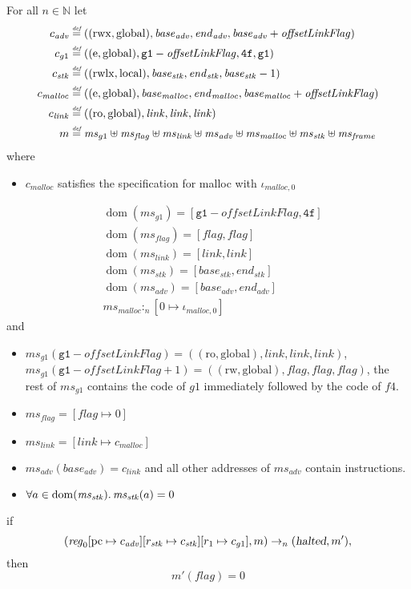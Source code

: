\documentclass[a4paper]{article}
\newcommand{\update}[2]{[#1 \mapsto #2]}
\newcommand{\defeq}{\stackrel{\textit{\tiny{def}}}{=}}
\DeclareMathOperator{\dom}{dom}
\newcommand{\var}[1]{\mathit{#1}}
\newcommand{\hs}{\var{ms}}
\newcommand{\ms}{\hs}
\newcommand{\pcreg}{\mathrm{pc}}
\newcommand{\start}{\var{base}}
\newcommand{\addrend}{\var{end}}
\newcommand{\reg}{\var{reg}}
\newcommand{\heap}{\var{mem}}
\newcommand{\adv}{\var{adv}}
\newcommand{\link}{\var{link}}
\newcommand{\stk}{\var{stk}}
\newcommand{\flag}{\var{flag}}
\newcommand{\pwl}{\var{pwl}}
\newcommand{\olf}{\var{offsetLinkFlag}}
\newcommand{\halted}{\textsl{halted}}
\newcommand{\heapSat}[3][\heap]{#1 :_{#2} #3}
\newcommand{\memSat}[3][n]{\heapSat[#2]{#1}{#3}}
\newcommand{\codelabel}[1]{\mathit{#1}}
\newcommand{\malloc}{\codelabel{malloc}}
\newcommand{\nats}{\mathbb{N}}
\newcommand{\plainperm}[1]{\mathrm{#1}}
\newcommand{\readonly}{\plainperm{ro}}
\newcommand{\readwrite}{\plainperm{rw}}
\newcommand{\entry}{\plainperm{e}}
\newcommand{\rwx}{\plainperm{rwx}}
\newcommand{\rwlx}{\plainperm{rwlx}}
\newcommand{\local}{\plainperm{local}}
\newcommand{\glob}{\plainperm{global}}
\newcommand{\step}[1][]{\rightarrow_{#1}}
\begin{document}
\begin{lemma}[Correctness of $g1$]
  \label{lem:correctness-g1}
  For all $n \in \nats$
  let
  \begin{align*}
    c_{\var{adv}} & \defeq ((\rwx,\glob),\start_{\adv},\addrend_{\adv},\start_{\adv}+\olf) \\
    c_{g1} & \defeq ((\entry,\glob),\mathtt{g1}-\olf,\mathtt{4f},\mathtt{g1}) \\
    c_\stk & \defeq ((\rwlx,\local),\start_\stk,\addrend_\stk,\start_\stk-1) \\
    c_\malloc & \defeq ((\entry,\glob),\start_\malloc,\addrend_\malloc,\start_\malloc+\olf) \\
    c_\link & \defeq ((\readonly,\glob),\link,\link,\link) \\
    m & \defeq \hs_{g1} \uplus 
        \ms_\flag \uplus                
        \ms_\link \uplus 
        \ms_\adv \uplus 
        \ms_\malloc \uplus 
        \ms_\stk \uplus
        \ms_{\var{frame}} 
  \end{align*}
  where 
  \begin{itemize}
  \item $c_\malloc$ satisfies the specification for malloc with $\iota_{\malloc,0}$
  \end{itemize}
  \begin{align*}
    &\dom(\hs_{g1}) = [\mathtt{g1}-\olf,\mathtt{4f}] \\
    &\dom(\hs_\flag) = [\flag,\flag] \\
    &\dom(\ms_\link) = [\link,\link]\\
    &\dom(\ms_\stk) = [\start_\stk, \addrend_\stk]\\
    &\dom(\hs_{\adv}) = [\start_\adv,\addrend_\adv] \\
    &\heapSat[\hs_{\malloc}]{n}{[0 \mapsto \iota_{\malloc,0}]}
  \end{align*}
  and
  \begin{itemize}
  \item $\ms_{g1}(\mathtt{g1}-\olf) = ((\readonly,\glob),\link,\link,\link)$, $\ms_{g1}(\mathtt{g1}-\olf+1) = ((\readwrite,\glob),\flag,\flag,\flag)$, the rest of $\hs_{g1}$ contains the code of $g1$ immediately followed by the code of $f4$.
  \item $\ms_\flag = [\flag \mapsto 0]$
  \item $\ms_{\var{link}} = [\link \mapsto c_\malloc]$
  \item $\hs_\adv(\start_\adv) = c_\link$ and all other addresses of $\ms_\adv$ contain instructions.
  \item $\forall a \in \dom(\ms_\stk) \ldotp \ms_\stk(a) = 0$ %
  \end{itemize}
  if 
  \[
    (\reg_0\update{\pcreg}{c_\adv}\update{r_\stk}{c_\stk}\update{r_1}{c_{g1}},m) \step[n] (\halted,m'),
  \]
  then
  \[
    m'(\flag) = 0
  \]  
\end{lemma}
\end{document}
